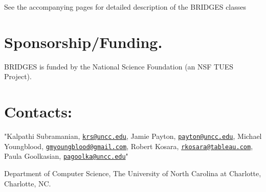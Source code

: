 See the accompanying pages for detailed description of the B\+R\+I\+D\+G\+E\+S classes \hypertarget{index_sponsor_sec}{}\section{Sponsorship/\+Funding.}\label{index_sponsor_sec}
B\+R\+I\+D\+G\+E\+S is funded by the National Science Foundation (an N\+S\+F T\+U\+E\+S Project).\hypertarget{index_contacts_sec}{}\section{Contacts\+:}\label{index_contacts_sec}
"Kalpathi Subramanian, \href{mailto:krs@uncc.edu}{\tt krs@uncc.\+edu}, Jamie Payton, \href{mailto:payton@uncc.edu}{\tt payton@uncc.\+edu}, Michael Youngblood, \href{mailto:gmyoungblood@gmail.com}{\tt gmyoungblood@gmail.\+com}, Robert Kosara, \href{mailto:rkosara@tableau.com}{\tt rkosara@tableau.\+com}, Paula Goolkasian, \href{mailto:pagoolka@uncc.edu}{\tt pagoolka@uncc.\+edu}"

Department of Computer Science, The University of North Carolina at Charlotte, Charlotte, N\+C. 
